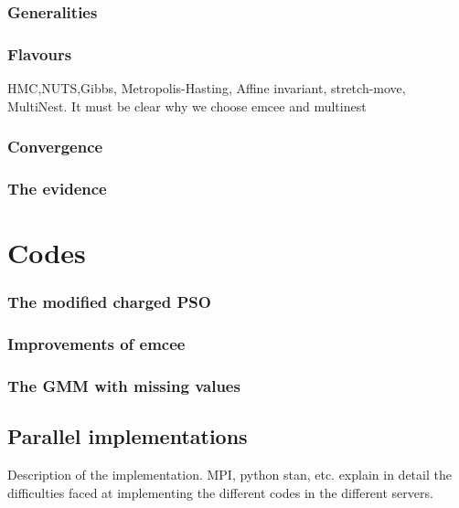 \subsubsection{Generalities}
\subsubsection{Flavours}
HMC,NUTS,Gibbs, Metropolis-Hasting, Affine invariant, stretch-move, MultiNest.
It must be clear why we choose emcee and multinest
\subsubsection{Convergence}
\subsubsection{The evidence}


\section{Codes}
\subsubsection{The modified charged PSO}
\subsubsection{Improvements of emcee}
\subsubsection{The GMM with missing values}
\subsection{Parallel implementations}
Description of the implementation. MPI, python stan, etc.
explain in detail the difficulties faced at implementing the different codes in the different servers.

